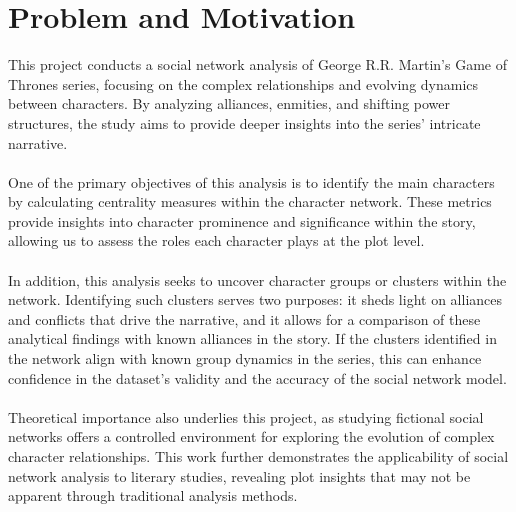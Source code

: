 \documentclass[12pt, a4paper]{article}
\begin{document}
\section{Problem and Motivation}
\label{problem-and-motivation}
This project conducts a social network analysis of George R.R. Martin’s Game of Thrones series, focusing on the complex relationships and evolving dynamics between characters. By analyzing alliances, enmities, and shifting power structures, the study aims to provide deeper insights into the series’ intricate narrative.
\\\\One of the primary objectives of this analysis is to identify the main characters by calculating centrality measures within the character network. These metrics provide insights into character prominence and significance within the story, allowing us to assess the roles each character plays at the plot level.
\\\\In addition, this analysis seeks to uncover character groups or clusters within the network. Identifying such clusters serves two purposes: it sheds light on alliances and conflicts that drive the narrative, and it allows for a comparison of these analytical findings with known alliances in the story. If the clusters identified in the network align with known group dynamics in the series, this can enhance confidence in the dataset’s validity and the accuracy of the social network model.
\\\\Theoretical importance also underlies this project, as studying fictional social networks offers a controlled environment for exploring the evolution of complex character relationships. This work further demonstrates the applicability of social network analysis to literary studies, revealing plot insights that may not be apparent through traditional analysis methods.
\end{document}
